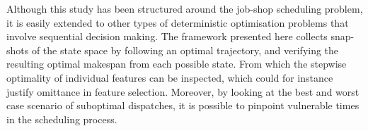 \documentclass[smallextended]{svjour3}
\begin{document}
Although this study has been structured around the job-shop scheduling problem, 
it is easily extended to other types of deterministic optimisation problems 
that involve sequential decision making. 	
The framework presented here collects snap-shots of the state space by 
following an optimal trajectory, and verifying the resulting optimal makespan 
from each possible state. 
From which the stepwise optimality of individual features can be inspected, 
which could for instance justify omittance in feature selection.  
Moreover, by looking at the best and worst case scenario of suboptimal 
dispatches, it is possible to pinpoint vulnerable times in the scheduling 
process. 

  

\end{document}
